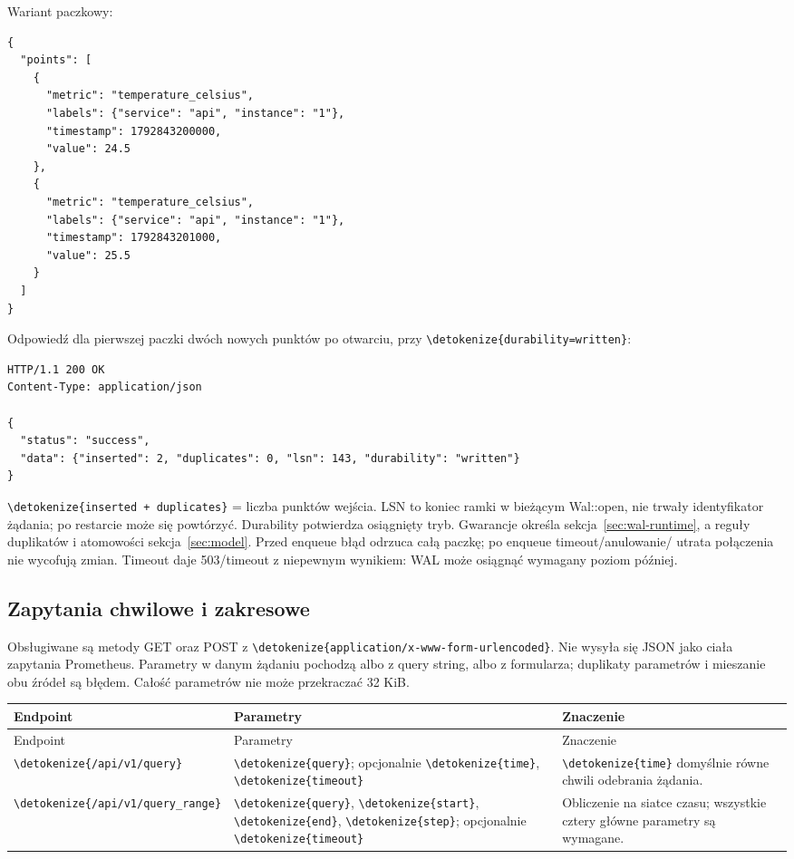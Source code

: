 \documentclass[11pt,a4paper]{article}
\newcommand{\code}[1]{\expandafter\nolinkurl\expandafter{\detokenize{#1}}}
\newcommand{\tabhead}[1]{\toprule #1\\ \midrule\endfirsthead
  \toprule #1\\ \midrule\endhead \bottomrule\endfoot}
\begin{document}
Wariant paczkowy:
\begin{lstlisting}
{
  "points": [
    {
      "metric": "temperature_celsius",
      "labels": {"service": "api", "instance": "1"},
      "timestamp": 1792843200000,
      "value": 24.5
    },
    {
      "metric": "temperature_celsius",
      "labels": {"service": "api", "instance": "1"},
      "timestamp": 1792843201000,
      "value": 25.5
    }
  ]
}
\end{lstlisting}

Odpowiedź dla pierwszej paczki dwóch nowych punktów po otwarciu,
przy \code{durability=written}:
\begin{lstlisting}
HTTP/1.1 200 OK
Content-Type: application/json

{
  "status": "success",
  "data": {"inserted": 2, "duplicates": 0, "lsn": 143, "durability": "written"}
}
\end{lstlisting}

\code{inserted + duplicates} = liczba punktów wejścia.
LSN to koniec ramki w bieżącym Wal::open, nie trwały identyfikator
żądania; po restarcie może się powtórzyć. Durability potwierdza osiągnięty tryb.
Gwarancje określa sekcja~\ref{sec:wal-runtime}, a reguły duplikatów
i atomowości sekcja~\ref{sec:model}.
Przed enqueue błąd odrzuca całą paczkę; po enqueue timeout/anulowanie/
utrata połączenia nie wycofują zmian. Timeout daje 503/timeout
z niepewnym wynikiem: WAL może osiągnąć wymagany poziom później.

\subsection{Zapytania chwilowe i zakresowe}
Obsługiwane są metody GET oraz POST z
\code{application/x-www-form-urlencoded}. Nie wysyła się JSON jako
ciała zapytania Prometheus. Parametry w danym żądaniu pochodzą albo
z query string, albo z formularza; duplikaty parametrów i mieszanie
obu źródeł są błędem. Całość parametrów nie może przekraczać 32 KiB.

\begin{longtable}{P{36mm}P{40mm}P{80mm}}
\tabhead{Endpoint & Parametry & Znaczenie}
\code{/api/v1/query} & \code{query}; opcjonalnie \code{time},
\code{timeout} & \code{time} domyślnie równe chwili odebrania żądania.\\
\code{/api/v1/query_range} & \code{query}, \code{start}, \code{end},
\code{step}; opcjonalnie \code{timeout} & Obliczenie na siatce czasu;
wszystkie cztery główne parametry są wymagane.\\
\end{longtable}
\end{document}
